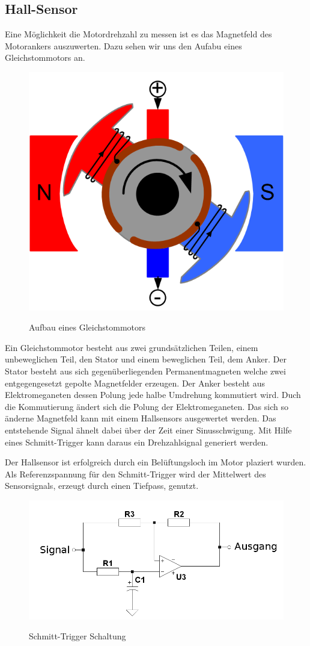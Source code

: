 \subsection{Hall-Sensor}
Eine Möglichkeit die Motordrehzahl zu messen ist es das Magnetfeld des
Motorankers auszuwerten. Dazu sehen wir uns den Aufabu eines Gleichstommotors an.
\begin{figure}[H]
\centering
\includegraphics[width=.5\textwidth]{motor.png}\\
\caption{Aufbau eines Gleichstommotors}%
\label{fig:aufbau_motor}
\end{figure}
Ein Gleichstommotor besteht aus zwei grundsätzlichen Teilen, einem unbeweglichen Teil, den Stator und einem beweglichen Teil, dem Anker.
Der Stator besteht aus sich gegenüberliegenden Permanentmagneten welche zwei entgegengesetzt gepolte Magnetfelder erzeugen.
Der Anker besteht aus Elektromeganeten dessen Polung jede halbe Umdrehung kommutiert wird. Duch die Kommutierung ändert sich die 
Polung der Elektromeganeten. Das sich so änderne Magnetfeld kann mit einem Hallsensors ausgewertet werden. Das entstehende 
Signal ähnelt dabei über der Zeit einer Sinusschwigung. Mit Hilfe eines Schmitt-Trigger kann daraus ein Drehzahlsignal generiert werden.

Der Hallsensor ist erfolgreich durch ein Belüftungsloch im Motor plaziert wurden. Als Referenzspannung für den Schmitt-Trigger wird der
Mittelwert des Sensorsignals, erzeugt durch einen Tiefpass, genutzt.

\begin{figure}[H]
\centering
\includegraphics[width=.5\textwidth]{schmitt.png}\\
\caption{Schmitt-Trigger Schaltung}%
\label{fig:schmitt}
\end{figure}

